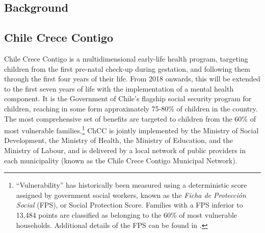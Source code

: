 \documentclass[12pt]{article}
\begin{document}
\begin{spacing}{1.4}

\section{Background}
\label{scn:backgroun}
\subsection{Chile Crece Contigo}
\label{sscn:ChCC}
Chile Crece Contigo is a multidimensional early-life health program,
targeting children from the first pre-natal check-up during gestation,
and following them through the first
four years of their life. From 2018 onwards, this will be extended
to the first seven years of life with the implementation of a mental
health component.  It is the Government of Chile's flagship social
security program for children, reaching in some form approximately
75-80\% of children in the country.  The most comprehensive set of
benefits are targeted to children from the 60\% of most vulnerable
families.\footnote{``Vulnerability'' has historically been measured
  using a deterministic score assigned by government social workers,
  known as the \emph{Ficha de Protecci\'on Social} (FPS), or Social
  Protection Score.  Families with a FPS inferior to 13,484 points are
  classified as belonging to the 60\% of most vulnerable households.
  Additional details of the FPS can be found in \citet{Herreraetal2010}.}
ChCC is jointly implemented by the Ministry of Social Development, the
Ministry of Health, the Ministry of Education, and the Ministry of
Labour, and is delivered by a local network of public providers in each
municipality (known as the Chile Crece Contigo Municipal Network).


\end{spacing}
\end{document}
